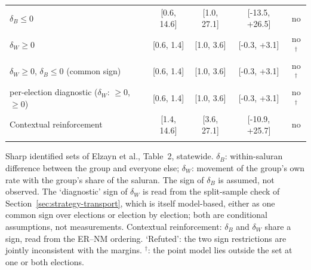 \begin{table}[!htb]
{\begin{tabular}{l ccc c}
\quad $\delta_B \le 0$ & [0.6, 14.6] & [1.0, 27.1] & [-13.5, +26.5] & no \\
\quad $\delta_W \ge 0$ & [0.6, 1.4] & [1.0, 3.6] & [-0.3, +3.1] & no$^{\dagger}$ \\
\quad $\delta_W \ge 0$, $\delta_B \le 0$ (common sign) & [0.6, 1.4] & [1.0, 3.6] & [-0.3, +3.1] & no$^{\dagger}$ \\
\quad per-election diagnostic ($\delta_W$: $\ge 0$, $\ge 0$) & [0.6, 1.4] & [1.0, 3.6] & [-0.3, +3.1] & no$^{\dagger}$ \\
\quad Contextual reinforcement & [1.4, 14.6] & [3.6, 27.1] & [-10.9, +25.7] & no \\
\addlinespace[3pt]
\bottomrule
\end{tabular}}\par\vspace{3pt}
{\footnotesize Sharp identified sets of Elzayn et al.\cite{elzayn2026}, Table~2, statewide. $\delta_B$: within-saluran difference between the group and everyone else; $\delta_W$: movement of the group's own rate with the group's share of the saluran. The sign of $\delta_B$ is assumed, not observed. The `diagnostic' sign of $\delta_W$ is read from the split-sample check of Section~\ref{sec:strategy-transport}, which is itself model-based, either as one common sign over elections or election by election; both are conditional assumptions, not measurements. Contextual reinforcement: $\delta_B$ and $\delta_W$ share a sign, read from the ER--NM ordering. `Refuted': the two sign restrictions are jointly inconsistent with the margins. $^{\dagger}$: the point model lies outside the set at one or both elections.}
\end{table}
